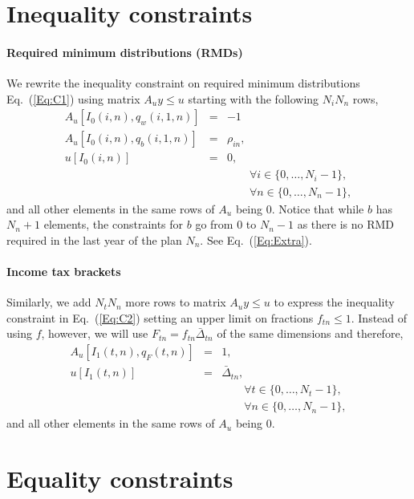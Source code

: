 \documentclass{report}[fleqn,12pt]
\begin{document}
\section{Inequality constraints}

\paragraph*{Required minimum distributions (RMDs)}
We rewrite the inequality constraint on required minimum distributions
Eq.~(\ref{Eq:C1}) using matrix $A_{u}y \le u$ starting with the following $N_iN_n$ rows, 
\begin{eqnarray}
	A_u[I_0(i, n), q_w(i, 1, n)] &=& -1 \nonumber \\
	A_u[I_0(i, n), q_b(i, 1, n)] &=& \rho_{in}, \nonumber \\
	u[I_0(i, n)] &=& 0, \\
	&&\qquad\forall i \in \{0,\ldots, N_i-1\}, \nonumber\\
	&&\qquad\forall n \in \{0,\ldots, N_n -1\},\nonumber
\end{eqnarray}
and all other elements in the same rows of $A_u$ being $0$.
Notice that while $b$ has $N_n+1$ elements, the constraints
for $b$ go from $0$ to $N_n-1$ as there is no RMD required in the last year of the plan $N_n$.
See Eq.~(\ref{Eq:Extra}).

\paragraph*{Income tax brackets}
Similarly, we add $N_t N_n$ more rows to matrix $A_uy \le u$ to express
the inequality constraint in Eq.~(\ref{Eq:C2})
setting an upper limit on fractions $f_{t n} \le 1$.
Instead of using $f$, however, we will use $F_{tn} = f_{tn}\bar{\Delta}_{tn}$
of the same dimensions and therefore,
\begin{eqnarray}
	A_u[I_1(t, n), q_F(t, n)] &=& 1, \nonumber \\
	u[I_1(t, n)] &=& \bar{\Delta}_{tn},\\
	&&\qquad\forall t \in \{0,\ldots, N_t-1\}, \nonumber\\
	&&\qquad\forall n \in \{0,\ldots, N_n -1\},\nonumber
\end{eqnarray}
and all other elements in the same rows of $A_u$ being $0$.

\section{Equality constraints}
\end{document}
